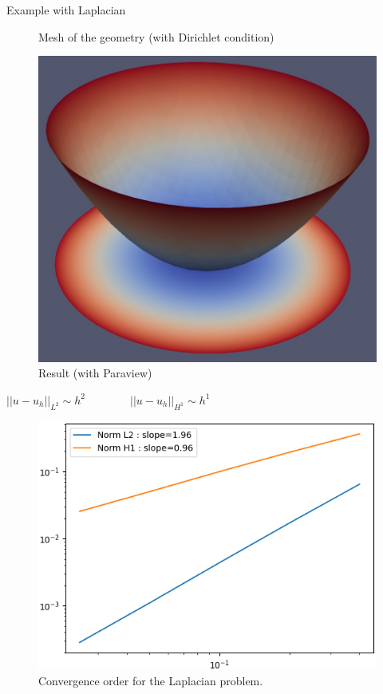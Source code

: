 \begin{frame}[allowframebreaks]{Example with Laplacian}
\begin{minipage}{0.31\linewidth}
\begin{figure}
			\caption{Mesh of the geometry (with Dirichlet condition)}
		\end{figure}
	\end{minipage} \quad
	\begin{minipage}{0.31\linewidth}
		\begin{figure}
			\includegraphics[width=\linewidth]{"images/parareal/circle_result.jpg"}
			\caption{Result (with Paraview)}
		\end{figure}	
	\end{minipage}

	\newpage
	\centering
	$||u-u_h||_{L^2}\sim h^2 \qquad \qquad ||u-u_h||_{H^1}\sim h^1 $
	\begin{figure}
		\includegraphics[width=0.52\linewidth]{"images/parareal/cvg_laplacian.png"}
		\caption{Convergence order for the Laplacian problem.}
	\end{figure}
\end{frame}

